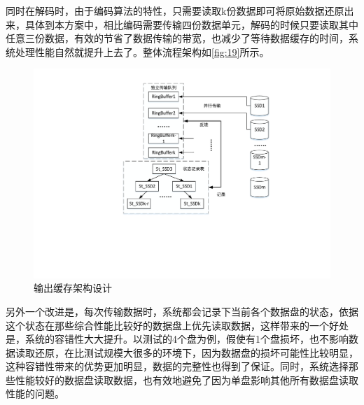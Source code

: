 同时在解码时，由于编码算法的特性，只需要读取k份数据即可将原始数据还原出来，具体到本方案中，相比编码需要传输四份数据单元，解码的时候只要读取其中任意三份数据，有效的节省了数据传输的带宽，也减少了等待数据缓存的时间，系统处理性能自然就提升上去了。整体流程架构如\autoref{fig:19}所示。
\begin{figure}
	\centering
	\includegraphics[width=1\textwidth]{Pics/parallel-read.pdf}
	\caption{输出缓存架构设计}
	\label{fig:19}
\end{figure}
另外一个改进是，每次传输数据时，系统都会记录下当前各个数据盘的状态，依据这个状态在那些综合性能比较好的数据盘上优先读取数据，这样带来的一个好处是，系统的容错性大大提升。以测试的4个盘为例，假使有1个盘损坏，也不影响数据读取还原，在比测试规模大很多的环境下，因为数据盘的损坏可能性比较明显，这种容错性带来的优势更加明显，数据的完整性也得到了保证。同时，系统选择那些性能较好的数据盘读取数据，也有效地避免了因为单盘影响其他所有数据盘读取性能的问题。
